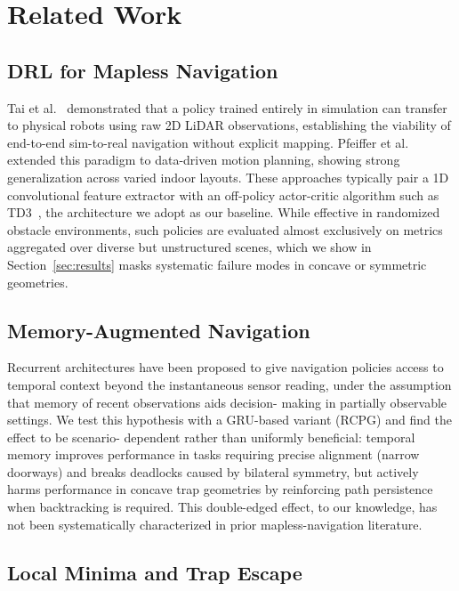 \section{Related Work}
\label{sec:related}

\subsection{DRL for Mapless Navigation}

Tai et al.~\cite{tai2017virtual} demonstrated that a policy trained
entirely in simulation can transfer to physical robots using raw
2D LiDAR observations, establishing the viability of end-to-end
sim-to-real navigation without explicit mapping. Pfeiffer et
al.~\cite{pfeiffer2017dl} extended this paradigm to data-driven motion
planning, showing strong generalization across varied indoor layouts.
These approaches typically pair a 1D convolutional feature extractor
with an off-policy actor-critic algorithm such as
TD3~\cite{fujimoto2018td3}, the architecture we adopt as our baseline.
While effective in randomized obstacle environments, such policies are
evaluated almost exclusively on metrics aggregated over diverse but
unstructured scenes, which we show in Section~\ref{sec:results} masks
systematic failure modes in concave or symmetric geometries.

\subsection{Memory-Augmented Navigation}

Recurrent architectures have been proposed to give navigation policies
access to temporal context beyond the instantaneous sensor reading,
under the assumption that memory of recent observations aids decision-
making in partially observable settings. We test this hypothesis with
a GRU-based variant (RCPG) and find the effect to be scenario-
dependent rather than uniformly beneficial: temporal memory improves
performance in tasks requiring precise alignment (narrow doorways) and
breaks deadlocks caused by bilateral symmetry, but actively harms
performance in concave trap geometries by reinforcing path persistence
when backtracking is required. This double-edged effect, to our
knowledge, has not been systematically characterized in prior
mapless-navigation literature.

\subsection{Local Minima and Trap Escape}

